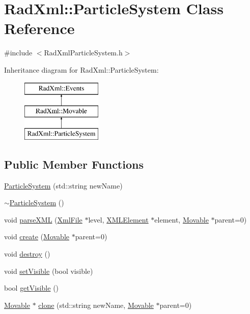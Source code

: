 \hypertarget{class_rad_xml_1_1_particle_system}{\section{Rad\-Xml\-:\-:Particle\-System Class Reference}
\label{class_rad_xml_1_1_particle_system}
}


{\ttfamily \#include $<$Rad\-Xml\-Particle\-System.\-h$>$}

Inheritance diagram for Rad\-Xml\-:\-:Particle\-System\-:\begin{figure}[H]
\begin{center}
\leavevmode
\includegraphics[height=3.000000cm]{class_rad_xml_1_1_particle_system}
\end{center}
\end{figure}
\subsection*{Public Member Functions}
\begin{DoxyCompactItemize}
\item 
\hyperlink{class_rad_xml_1_1_particle_system_a11896587e0c01fbabdd0508c02853c3f}{Particle\-System} (std\-::string new\-Name)
\item 
\hyperlink{class_rad_xml_1_1_particle_system_aa2bcc726d55bde35750f9acea7f7cab0}{$\sim$\-Particle\-System} ()
\item 
void \hyperlink{class_rad_xml_1_1_particle_system_a5eb53e3853ad43c352bba103f36d37e1}{parse\-X\-M\-L} (\hyperlink{class_rad_xml_1_1_xml_file}{Xml\-File} $\ast$level, \hyperlink{class_x_m_l_element}{X\-M\-L\-Element} $\ast$element, \hyperlink{class_rad_xml_1_1_movable}{Movable} $\ast$parent=0)
\item 
void \hyperlink{class_rad_xml_1_1_particle_system_a9bb9eb08de16eaf9ccfc818bf4d4295d}{create} (\hyperlink{class_rad_xml_1_1_movable}{Movable} $\ast$parent=0)
\item 
void \hyperlink{class_rad_xml_1_1_particle_system_a6a725788b52131a7c0479c6d4c284326}{destroy} ()
\item 
void \hyperlink{class_rad_xml_1_1_particle_system_a504da30d0dff6decbc6e4d6b096a9664}{set\-Visible} (bool visible)
\item 
bool \hyperlink{class_rad_xml_1_1_particle_system_a75e758fdcbdf15dc4991acd04430a550}{get\-Visible} ()
\item 
\hyperlink{class_rad_xml_1_1_movable}{Movable} $\ast$ \hyperlink{class_rad_xml_1_1_particle_system_acb8ccf54b1c21dba934e0778e039da56}{clone} (std\-::string new\-Name, \hyperlink{class_rad_xml_1_1_movable}{Movable} $\ast$parent=0)
\end{DoxyCompactItemize}
